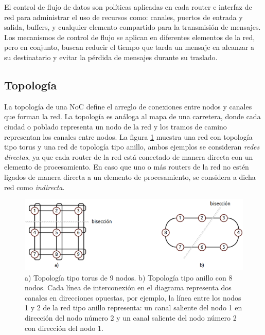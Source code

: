 El control de flujo de datos son políticas aplicadas en cada router e interfaz de red para administrar el uso de recursos como: canales, puertos de entrada y salida, buffers, y cualquier elemento compartido para la transmisión de mensajes. Los mecanismos de control de flujo se aplican en diferentes elementos de la red, pero en conjunto, buscan reducir el tiempo que tarda un mensaje en alcanzar a su destinatario y evitar la pérdida de mensajes durante su traslado.





\subsection{Topología}

La topología de una NoC define el arreglo de conexiones entre nodos y canales que forman la red. La topología es análoga al mapa de una carretera, donde cada ciudad o poblado representa un nodo de la red y los tramos de camino representan los canales entre nodos. La figura \ref{fig:ch1_topologia} muestra una red con topología tipo torus y una red de topología tipo anillo, ambos ejemplos se consideran \textit{redes directas}, ya que cada router de la red está conectado de manera directa con un elemento de procesamiento. En caso que uno o más routers de la red no estén ligados de manera directa a un elemento de procesamiento, se considera a dicha red como \textit{indirecta}.

\begin{figure}
	\begin{center}
		\includegraphics[scale=0.7]{figures/ch1_topologia.png}
	\end{center}
	\caption
		{	
			a) Topología tipo torus de 9 nodos. b) Topología tipo anillo con 8 nodos. Cada línea de interconexión en el diagrama representa dos canales en direcciones opuestas, por ejemplo, la línea entre los nodos 1 y 2 de la red tipo anillo representa: un canal saliente del nodo 1 en dirección del nodo número 2 y un canal saliente del nodo número 2 con dirección del nodo 1.
		}
	\label{fig:ch1_topologia}
\end{figure}

